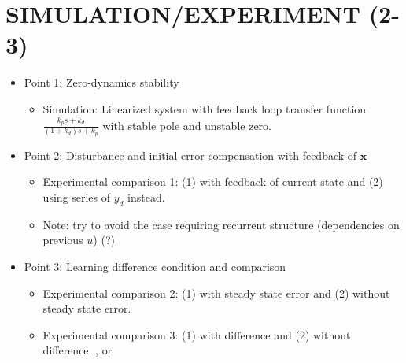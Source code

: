 

\section{SIMULATION/EXPERIMENT (2-3)}
\begin{itemize}
\item Point 1: Zero-dynamics stability
\begin{itemize}
\item Simulation: Linearized system with feedback loop transfer function $\frac{k_ps+k_d}{(1+k_d)s+k_p}$ with stable pole and unstable zero. \color{blue}{Fig. 2D trajectory plot ($y$ and $y_d$ versus time) showing instability}
\end{itemize}
\item Point 2: Disturbance and initial error compensation with feedback of $\mathbf{x}$
\begin{itemize}
\item Experimental comparison 1: (1) with feedback of current state and (2) using series of $y_d$ instead. \color{blue}{Fig. Error plots in two directions showing benefits of using current state feedback.}\color{grey1}
\item Note: try to avoid the case requiring recurrent structure (dependencies on previous $u$) (?)
\end{itemize}
\item Point 3: Learning difference condition and comparison
\begin{itemize}
\item Experimental comparison 2: (1) with steady state error and (2) without steady state error. \color{blue}{Fig. Error plots for case with constant input or arbitrary.}\color{grey1}
\item Experimental comparison 3: (1) with difference and (2) without difference. \color{blue}{Fig. Scatter plots of training points that correspond to similar performance}\color{grey1}, or \color{blue}{Fig. Error plots showing performance comparison for same number of training points.}
\end{itemize}
\end{itemize}


